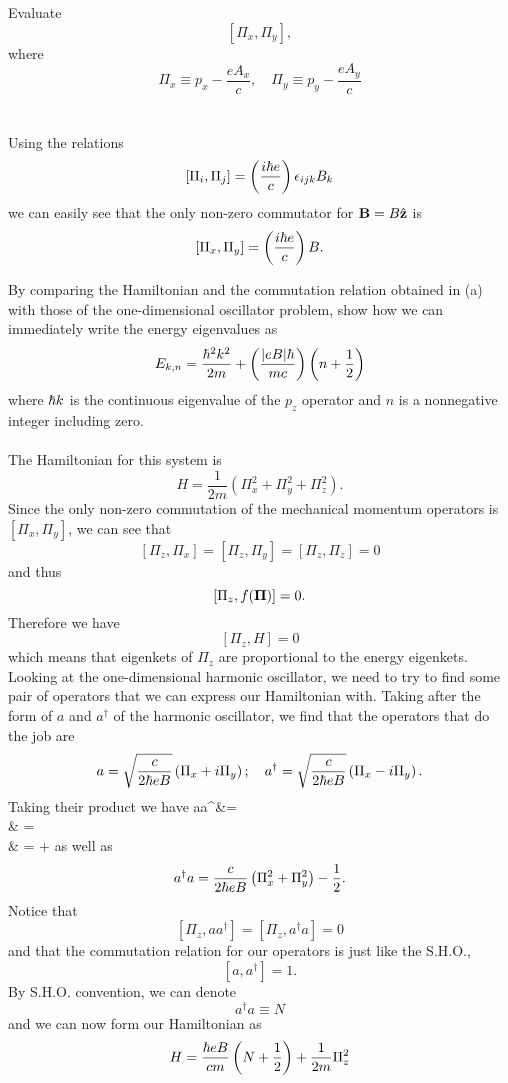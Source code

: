 \documentclass[11pt,letterpaper]{article}
\begin{document}
	\benum
		\item
		Evaluate
		\[
			[\Pi_x,\Pi_y],
		\]
		where
		\[
			\Pi_x \equiv p_x-\frac{eA_x}{c},\quad\Pi_y \equiv p_y-\frac{eA_y}{c}
		\]
		\\
		\\
		Using the relations
		\[
			[\Pi_i,\Pi_j] = \left(\frac{i\hbar e}{c}\right)\epsilon_{ijk}B_k
		\]
		we can easily see that the only non-zero commutator for $\mathbf{B} = B\hat{\mathbf{z}}$ is
		\[
			[\Pi_x,\Pi_y]  = \left(\frac{i\hbar e}{c}\right)B.
		\]
		\item 
		By comparing the Hamiltonian and the commutation relation obtained in (a) with those of the one-dimensional oscillator problem, 
		show how we can immediately write the energy eigenvalues as
		\[
			E_{k,n} = \frac{\hbar^2k^2}{2m}+\left(\frac{|eB|\hbar}{mc}\right)\left(n+\frac 12\right)
		\]
		where $\hbar k$ is the continuous eigenvalue of the $p_z$ operator and $n$ is a nonnegative integer including zero. 
		\\
		\\
		The Hamiltonian for this system is 
		\[
			H = \frac{1}{2m}(\Pi_x^2+\Pi_y^2+\Pi_z^2).
		\]
		Since the only non-zero commutation of the mechanical momentum operators is $[\Pi_x,\Pi_y]$, we can see that 
		\[
			[\Pi_z,\Pi_x] = [\Pi_z,\Pi_y] = [\Pi_z,\Pi_z]= 0
		\]
		and thus
		\[
			[\Pi_z,f(\mathbf{\Pi})] = 0.
		\]
		Therefore we have
		\[
			[\Pi_z,H] = 0
		\]
		which means that eigenkets of $\Pi_z$ are proportional to the energy eigenkets. Looking at the one-dimensional harmonic oscillator, 
		we need to try to find some pair of operators that we can express our Hamiltonian with. Taking after the form of $a$ and $a^\dag$ of 
		the harmonic oscillator, we find that the operators that do the job are 
		\[
			a= \sqrt{\frac{c}{2\hbar eB}}\left(\Pi_x+i\Pi_y\right);\quad a^\dag =  \sqrt{\frac{c}{2\hbar eB}}\left(\Pi_x-i\Pi_y\right).
		\]
		Taking their product we have
		\ba
			aa^\dag &= \\
				     & =  \\
				     & =  +
		\ea
		as well as
		\[
			a^\dag a = \frac{c}{2\hbar eB}\left(\Pi_x^2+\Pi_y^2\right) -\frac{1}{2}.
		\]
		Notice that 
		\[
			[\Pi_z,aa^\dag] = [\Pi_z,a^\dag a] = 0
		\]
		and that the commutation relation for our operators is just like the S.H.O., 
		\[
			[a,a^\dag] = 1.
		\]
		By S.H.O. convention, we can denote 
		\[
			a^\dag a \equiv N
		\]
		and we can now form our Hamiltonian as
		\[
			H = \frac{\hbar e B}{cm}\left( N  +\frac{1}{2}\right)+\frac{1}{2m}\Pi_z^2
		\]
\end{document}
